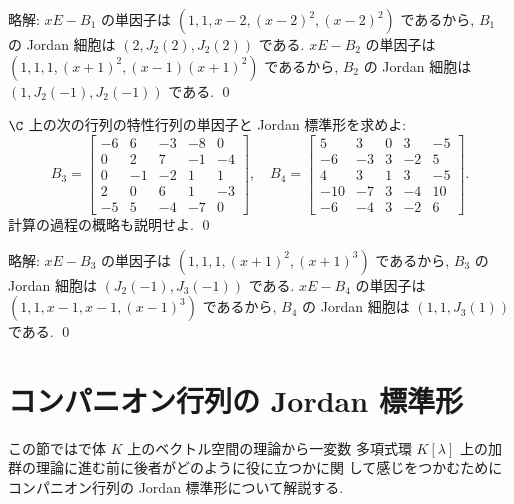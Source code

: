 \documentclass[12pt,twoside]{jarticle}
\newcommand\commentout[1]{#1}
\newcommand\commentout[1]{}
\begin{document}
\commentout{
\noindent
略解: $xE-B_1$ の単因子は $(1,1,x-2,(x-2)^2,(x-2)^2)$ であるから,
$B_1$ の Jordan 細胞は $(2,J_2(2),J_2(2))$ である.
$xE - B_2$ の単因子は $(1,1,1,(x+1)^2,(x-1)(x+1)^2)$ であるから,
$B_2$ の Jordan 細胞は $(1,J_2(-1),J_2(-1))$ である.
\qed
}


\begin{question}
\label{q:ed-j-7}
  $\C$ 上の次の行列の特性行列の単因子と Jordan 標準形を求めよ:
  \begin{equation*}
    B_3 = \left[ 
      \begin{array}{rrrrr}
        -6 & 6 & -3 & -8 & 0 \\
        0 & 2 & 7 & -1 & -4 \\
        0 & -1 & -2 & 1 & 1 \\
        2 & 0 & 6 & 1 & -3 \\
        -5 & 5 & -4 & -7 & 0
      \end{array}
    \right],
    \quad
    B_4 = \left[ 
      \begin{array}{rrrrr}
        5 & 3 & 0 & 3 & -5 \\
        -6 & -3 & 3 & -2 & 5 \\
        4 & 3 & 1 & 3 & -5 \\
        -10 & -7 & 3 & -4 & 10 \\
        -6 & -4 & 3 & -2 & 6
      \end{array}
    \right].
  \end{equation*}
  計算の過程の概略も説明せよ. \qed
\end{question}

\commentout{
\noindent
略解: $xE-B_3$ の単因子は $(1,1,1,(x+1)^2,(x+1)^3)$ であるから,
$B_3$ の Jordan 細胞は $(J_2(-1),J_3(-1))$ である.
$xE-B_4$ の単因子は $(1,1,x-1,x-1,(x-1)^3)$ であるから,
$B_4$ の Jordan 細胞は $(1,1,J_3(1))$ である.
\qed
}


\section{コンパニオン行列の Jordan 標準形}
\label{sec:Jordan-companion}

この節ではで体 $K$ 上のベクトル空間の理論から一変数
多項式環 $K[\lambda]$ 上の加群の理論に進む前に後者がどのように役に立つかに関
して感じをつかむためにコンパニオン行列の Jordan 標準形について解説する.
\end{document}
